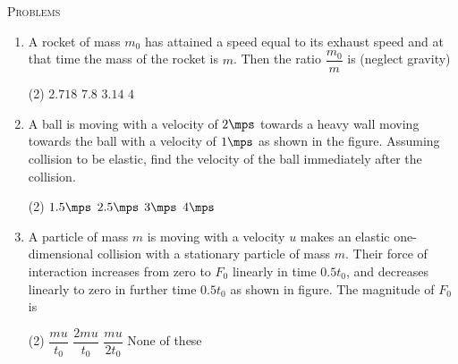 \documentclass{article}
\renewcommand{\ans}{\quad}
\begin{document}
\begin{center}
    \textsc{Problems}
\end{center}
\begin{enumerate}

    \item A rocket of mass $m_0$ has attained a speed equal to its exhaust speed and at that time the mass of
    the rocket is $m$. Then the ratio $\dfrac{m_0}{m}$ is (neglect gravity)
    \begin{tasks}(2)
        \task $2.718$\ans
        \task $7.8$
        \task $3.14$
        \task $4$
    \end{tasks}

    \item A ball is moving with a velocity of $2\mps$ towards a heavy wall moving towards the ball with a velocity of $1\mps$ as shown in the figure. Assuming collision to be elastic, find the velocity of the ball immediately after the collision.
    \begin{center}
    \end{center}
    \begin{tasks}(2)
        \task $1.5\mps$
        \task $2.5\mps$
        \task $3\mps$
        \task $4\mps$\ans
    \end{tasks}

    \item A particle of mass $m$ is moving with a velocity $u$ makes an elastic one-dimensional collision  with a stationary particle of mass $m$. Their force of interaction increases from zero to $F_0$ linearly in time $0.5t_0$, and decreases linearly to zero in further time $0.5t_0$ as shown in figure. The magnitude of $F_0$ is
    \begin{center}
    \end{center}
    \begin{tasks}(2)
        \task $\dfrac{mu}{t_0}$
        \task $\dfrac{2mu}{t_0}$\ans
        \task $\dfrac{mu}{2t_0}$
        \task None of these
    \end{tasks}


\end{enumerate}
\end{document}

